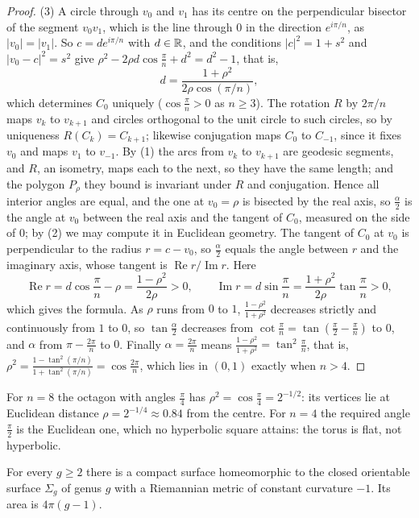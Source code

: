 \begin{proof}
(3) A circle through $v_0$ and $v_1$ has its centre on the perpendicular bisector of the segment $v_0v_1$, which is the line through $0$ in the direction $e^{i\pi/n}$, as $|v_0| = |v_1|$. So
$c = de^{i\pi/n}$ with $d \in \mathbb{R}$, and the conditions $|c|^2 = 1 + s^2$ and $|v_0 - c|^2 = s^2$ give $\rho^2 - 2\rho d\cos\frac{\pi}{n} + d^2 = d^2 - 1$, that is,
\[
d = \frac{1 + \rho^2}{2\rho\cos(\pi/n)} ,
\]
which determines $C_0$ uniquely ($\cos\frac{\pi}{n} > 0$ as $n \geq 3$). The rotation $R$ by $2\pi/n$ maps $v_k$ to $v_{k+1}$ and circles orthogonal to the unit circle to such circles, so by uniqueness
$R(C_k) = C_{k+1}$; likewise conjugation maps $C_0$ to $C_{-1}$, since it fixes $v_0$ and maps $v_1$ to $v_{-1}$. By (1) the arcs from $v_k$ to $v_{k+1}$ are geodesic segments, and $R$, an isometry, maps
each to the next, so they have the same length; and the polygon $P_\rho$ they bound is invariant under $R$ and conjugation. Hence all interior angles are equal, and the one at $v_0 = \rho$ is bisected by
the real axis, so $\frac{\alpha}{2}$ is the angle at $v_0$ between the real axis and the tangent of $C_0$, measured on the side of $0$; by (2) we may compute it in Euclidean geometry. The tangent of
$C_0$ at $v_0$ is perpendicular to the radius $r = c - v_0$, so $\frac{\alpha}{2}$ equals the angle between $r$ and the imaginary axis, whose tangent is $\operatorname{Re}r/\operatorname{Im}r$. Here
\[
\operatorname{Re}r = d\cos\frac{\pi}{n} - \rho = \frac{1 - \rho^2}{2\rho} > 0, \qquad \operatorname{Im}r = d\sin\frac{\pi}{n} = \frac{1 + \rho^2}{2\rho}\tan\frac{\pi}{n} > 0,
\]
which gives the formula. As $\rho$ runs from $0$ to $1$, $\frac{1 - \rho^2}{1 + \rho^2}$ decreases strictly and continuously from $1$ to $0$, so $\tan\frac{\alpha}{2}$ decreases from
$\cot\frac{\pi}{n} = \tan(\frac{\pi}{2} - \frac{\pi}{n})$ to $0$, and $\alpha$ from $\pi - \frac{2\pi}{n}$ to $0$. Finally $\alpha = \frac{2\pi}{n}$ means $\frac{1 - \rho^2}{1 + \rho^2} = \tan^2\frac{\pi}{n}$,
that is, $\rho^2 = \frac{1 - \tan^2(\pi/n)}{1 + \tan^2(\pi/n)} = \cos\frac{2\pi}{n}$, which lies in $(0, 1)$ exactly when $n > 4$.
\end{proof}

For $n = 8$ the octagon with angles $\frac{\pi}{4}$ has $\rho^2 = \cos\frac{\pi}{4} = 2^{-1/2}$: its vertices lie at Euclidean distance $\rho = 2^{-1/4} \approx 0.84$ from the centre. For $n = 4$ the required angle $\frac{\pi}{2}$ is the Euclidean one, which no hyperbolic square attains: the torus is flat, not hyperbolic.

\begin{proposition}\label{riemannian-geometry:proposition-hyperbolic-surfaces}
For every $g \geq 2$ there is a compact surface homeomorphic to the closed orientable surface $\Sigma_g$ of genus $g$ with a Riemannian metric of constant curvature $-1$. Its area is $4\pi(g - 1)$.
\end{proposition}

